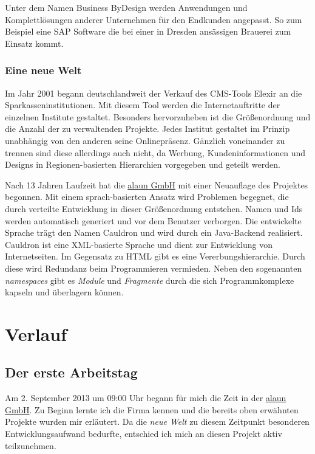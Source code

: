 \documentclass[12pt]{article}
\begin{document}
Unter dem Namen Business ByDesign werden Anwendungen und Komplettlösungen anderer Unternehmen für den
Endkunden angepasst. So zum Beispiel eine SAP Software die bei einer in Dresden ansässigen Brauerei zum Einsatz kommt.

\subsubsection{Eine neue Welt}

Im Jahr 2001 begann deutschlandweit der Verkauf des CMS-Tools Elexir an die Sparkasseninstitutionen. 
Mit diesem Tool werden die Internetauftritte der einzelnen Institute gestaltet. 
Besonders hervorzuheben ist die Größenordnung und die Anzahl der zu verwaltenden Projekte. Jedes Institut gestaltet im Prinzip unabhängig von den anderen seine Onlinepräsenz.
Gänzlich voneinander zu trennen sind diese allerdings auch nicht, da Werbung, Kundeninformationen und Designs in
Regionen-basierten Hierarchien vorgegeben und geteilt werden.

Nach 13 Jahren Laufzeit hat die \href{https://alaun.de/home/}{alaun GmbH} mit einer Neuauflage des Projektes begonnen.
Mit einem sprach-basierten Ansatz wird Problemen begegnet, die durch verteilte Entwicklung in dieser Größenordnung
entstehen. Namen und Ids werden automatisch generiert und vor dem Benutzer verborgen. 
Die entwickelte Sprache trägt den Namen Cauldron und wird durch ein Java-Backend realisiert.
Cauldron ist eine XML-basierte Sprache und dient zur Entwicklung von Internetseiten.
Im Gegensatz zu HTML gibt es eine Vererbungshierarchie. Durch diese wird Redundanz beim Programmieren vermieden.
Neben den sogenannten \textit{namespaces} gibt es \textit{Module} und \textit{Fragmente} durch die sich
Programmkomplexe kapseln und überlagern können. 


\section{Verlauf}

\subsection{Der erste Arbeitstag}

Am 2. September 2013 um 09:00 Uhr begann für mich die Zeit in der \href{https://alaun.de/home/}{alaun GmbH}.
Zu Beginn lernte ich die Firma kennen und die bereits oben erwähnten Projekte wurden mir erläutert.
Da die \textit{neue Welt} zu diesem Zeitpunkt besonderen Entwicklungsaufwand bedurfte, entschied ich mich
an diesen Projekt aktiv teilzunehmen.
\end{document}
